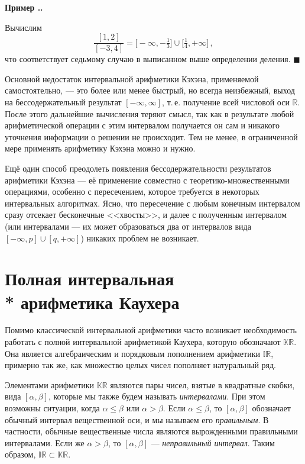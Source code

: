 \documentclass[a5paper,openany]{book}
\newcommand{\mbb}{\mathbb}
\newcounter{ExmpNum}[section]
\renewcommand{\theExmpNum}{\thesection.\arabic{ExmpNum}}
\newenvironment{example}%
  {\refstepcounter{ExmpNum}%
  \par\addvspace{\medskipamount} 
  \noindent\textbf{Пример {\theExmpNum}.}
  }%
  {\hfill$\blacksquare$\par\medskip}
\begin{document}
\begin{example} 
Вычислим 
\begin{equation*} 
\frac{[1, 2]}{[-3, 4]} = 
   \bigl[-\infty, -\tfrac{1}{3}\bigr]\cup\bigl[\tfrac{1}{4}, +\infty\bigr]\,, 
\end{equation*} 
что соответствует седьмому случаю в выписанном выше определении деления. 
\end{example} 
  
Основной недостаток интервальной арифметики Кэхэна, применяемой самостоятельно, 
--- это более или менее быстрый, но всегда неизбежный, выход на бессодержательный 
результат $[-\infty, \infty]$, т.\,е. получение всей числовой оси $\mbb{R}$. После 
этого дальнейшие вычисления теряют смысл, так как в результате любой арифметической 
операции с этим интервалом получается он сам и никакого уточнения информации о решении 
не происходит. Тем не менее, в ограниченной мере применять арифметику Кэхэна можно 
и нужно. 
  
Ещё один способ преодолеть появления бессодержательности результатов арифметики 
Кэхэна --- её применение совместно с теоретико-множественными операциями, особенно 
с пересечением, которое требуется в некоторых интервальных алгоритмах. Ясно, 
что пересечение с любым конечным интервалом сразу отсекает бесконечные <<хвосты>>, 
и далее с полученным интервалом (или интервалами --- их может образоваться два 
от интервалов вида $[-\infty, p]\cup[q, +\infty]$) никаких проблем не возникает. 
  
  
  
\section[Полная интервальная арифметика Каухера]%
        {Полная интервальная \\* арифметика Каухера} 
\label{KaucherArithmSect} 
  
Помимо классической интервальной арифметики часто возникает необходимость работать 
с полной интервальной арифметикой Каухера, которую обозначают $\mbb{KR}$. Она является 
алгебраическим и порядковым пополнением арифметики $\mbb{IR}$, примерно так же, 
как множество целых чисел пополняет натуральный ряд. 
  
Элементами арифметики $\mbb{KR}$ являются пары чисел, взятые в квадратные скобки,  
вида $[\alpha, \beta]$, которые мы также будем называть \textit{интервалами}. 
При этом возможны ситуации, когда $\alpha\leq\beta$ или $\alpha > \beta$. Если 
$\alpha\leq \beta$, то $[\alpha, \beta]$ обозначает обычный интервал вещественной оси, 
и мы называем его \textit{правильным}. В частности, обычные вещественные числа являются 
вырожденными правильными интервалами. Если же $\alpha >  \beta$, то $[\alpha, \beta]$ 
--- \textit{неправильный интервал}. Таким образом, $\mbb{IR}\subset\mbb{KR}$. 
 
  
\end{document}
